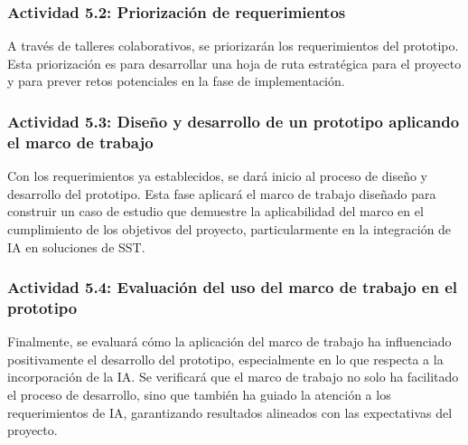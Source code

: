 \subsubsection{Actividad 5.2: Priorización de requerimientos}
A través de talleres colaborativos, se priorizarán los requerimientos del prototipo. Esta priorización es para desarrollar una hoja de ruta estratégica para el proyecto y para prever retos potenciales en la fase de implementación.

\subsubsection{Actividad 5.3: Diseño y desarrollo de un prototipo aplicando el marco de trabajo}
Con los requerimientos ya establecidos, se dará inicio al proceso de diseño y desarrollo del prototipo. Esta fase aplicará el marco de trabajo diseñado para construir un caso de estudio que demuestre la aplicabilidad del marco en el cumplimiento de los objetivos del proyecto, particularmente en la integración de IA en soluciones de SST.

\subsubsection{Actividad 5.4: Evaluación del uso del marco de trabajo en el prototipo}
Finalmente, se evaluará cómo la aplicación del marco de trabajo ha influenciado positivamente el desarrollo del prototipo, especialmente en lo que respecta a la incorporación de la IA. Se verificará que el marco de trabajo no solo ha facilitado el proceso de desarrollo, sino que también ha guiado la atención a los requerimientos de IA, garantizando resultados alineados con las expectativas del proyecto.





